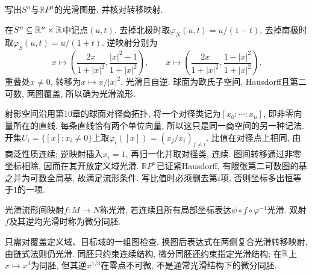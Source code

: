 \begin{example}
写出$S^n$与$\mathbb RP^n$的光滑图册, 并核对转移映射.
\end{example}
\begin{solution}
在$S^n\subseteq\mathbb R^n\times\mathbb R$中记点$(u,t)$. 去掉北极时取$\varphi_N(u,t)=u/(1-t)$, 去掉南极时取$\varphi_S(u,t)=u/(1+t)$. 逆映射分别为
\[
 x\longmapsto\left(\frac{2x}{1+|x|^2},\frac{|x|^2-1}{1+|x|^2}\right),\qquad
 x\longmapsto\left(\frac{2x}{1+|x|^2},\frac{1-|x|^2}{1+|x|^2}\right).
\]
重叠处$x\ne0$, 转移为$x\mapsto x/|x|^2$, 光滑且自逆. 球面为欧氏子空间, Hausdorff且第二可数, 两图覆盖, 所以确为光滑流形.

射影空间沿用第10章的球面对径商拓扑, 将一个对径类记为$[x_0:\cdots:x_n]$, 即非零向量所在的直线. 每条直线恰有两个单位向量, 所以这只是同一商空间的另一种记法. 开集$U_i=\{[x]:x_i\ne0\}$上取$\varphi_i([x])=(x_j/x_i)_{j\ne i}$. 比值在对径点上相同, 由商泛性质连续; 逆映射插入$x_i=1$, 再归一化并取对径类, 连续. 图间转移通过非零坐标相除, 因而在其开放定义域光滑. $\mathbb RP^n$已证紧Hausdorff, 有限张第二可数图的基之并为可数全局基, 故满足流形条件. 写比值时必须删去第$i$项, 否则坐标多出恒等于$1$的一项.
\end{solution}

\begin{definition}
光滑流形间映射$f:M\to N$称光滑, 若连续且所有局部坐标表达$\psi\circ f\circ\varphi^{-1}$光滑. 双射$f$及其逆均光滑时称为微分同胚.
\end{definition}
只需对覆盖定义域、目标域的一组图检查. 换图后表达式在两侧复合光滑转移映射, 由链式法则仍光滑. 同胚只约束连续结构, 微分同胚还约束指定光滑结构; 在$\mathbb R$上$x\mapsto x^3$为同胚, 但其逆$x^{1/3}$在零点不可微, 不是通常光滑结构下的微分同胚.

